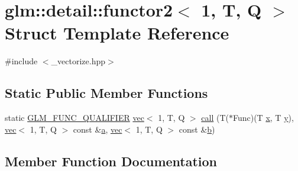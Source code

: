 \hypertarget{structglm_1_1detail_1_1functor2_3_011_00_01_t_00_01_q_01_4}{}\section{glm\+:\+:detail\+:\+:functor2$<$ 1, T, Q $>$ Struct Template Reference}
\label{structglm_1_1detail_1_1functor2_3_011_00_01_t_00_01_q_01_4}


{\ttfamily \#include $<$\+\_\+vectorize.\+hpp$>$}

\subsection*{Static Public Member Functions}
\begin{DoxyCompactItemize}
\item 
static \mbox{\hyperlink{setup_8hpp_a33fdea6f91c5f834105f7415e2a64407}{G\+L\+M\+\_\+\+F\+U\+N\+C\+\_\+\+Q\+U\+A\+L\+I\+F\+I\+ER}} \mbox{\hyperlink{structglm_1_1vec}{vec}}$<$ 1, T, Q $>$ \mbox{\hyperlink{structglm_1_1detail_1_1functor2_3_011_00_01_t_00_01_q_01_4_a0b888a7ffd7160ff96736ecad347708c}{call}} (T($\ast$Func)(T \mbox{\hyperlink{_s_d_l__opengl_8h_ad0e63d0edcdbd3d79554076bf309fd47}{x}}, T \mbox{\hyperlink{_s_d_l__opengl_8h_a1675d9d7bb68e1657ff028643b4037e3}{y}}), \mbox{\hyperlink{structglm_1_1vec}{vec}}$<$ 1, T, Q $>$ const \&\mbox{\hyperlink{_s_d_l__opengl__glext_8h_a3309789fc188587d666cda5ece79cf82}{a}}, \mbox{\hyperlink{structglm_1_1vec}{vec}}$<$ 1, T, Q $>$ const \&\mbox{\hyperlink{_s_d_l__opengl__glext_8h_a0f71581a41fd2264c8944126dabbd010}{b}})
\end{DoxyCompactItemize}


\subsection{Member Function Documentation}
\mbox{\label{structglm_1_1detail_1_1functor2_3_011_00_01_t_00_01_q_01_4_a0b888a7ffd7160ff96736ecad347708c}} 
